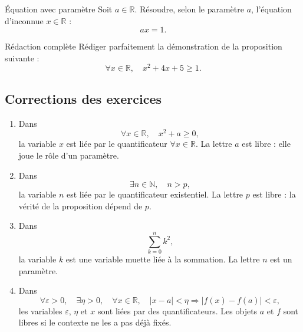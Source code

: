 \documentclass[11pt,a4paper]{article}
\begin{document}
\begin{exercicebox}{Équation avec paramètre}{}
Soit $a\in\mathbb{R}$. Résoudre, selon le paramètre $a$, l'équation d'inconnue $x\in\mathbb{R}$ :
\[
ax=1.
\]
\end{exercicebox}

\begin{exercicebox}{Rédaction complète}{}
Rédiger parfaitement la démonstration de la proposition suivante :
\[
\forall x\in\mathbb{R},\quad x^2+4x+5\geq 1.
\]
\end{exercicebox}

\subsection{Corrections des exercices}

\begin{preuvebox}[title={Correction de l'exercice 1}]

\begin{enumerate}
    \item Dans
    \[
    \forall x\in\mathbb{R},\quad x^2+a\geq 0,
    \]
    la variable $x$ est liée par le quantificateur $\forall x\in\mathbb{R}$. La lettre $a$ est libre : elle joue le rôle d'un paramètre.

    \item Dans
    \[
    \exists n\in\mathbb{N},\quad n>p,
    \]
    la variable $n$ est liée par le quantificateur existentiel. La lettre $p$ est libre : la vérité de la proposition dépend de $p$.

    \item Dans
    \[
    \sum_{k=0}^{n} k^2,
    \]
    la variable $k$ est une variable muette liée à la sommation. La lettre $n$ est un paramètre.

    \item Dans
    \[
    \forall \varepsilon>0,\quad \exists \eta>0,\quad \forall x\in\mathbb{R},\quad |x-a|<\eta \Rightarrow |f(x)-f(a)|<\varepsilon,
    \]
    les variables $\varepsilon$, $\eta$ et $x$ sont liées par des quantificateurs. Les objets $a$ et $f$ sont libres si le contexte ne les a pas déjà fixés.
\end{enumerate}

\end{preuvebox}
\end{document}
